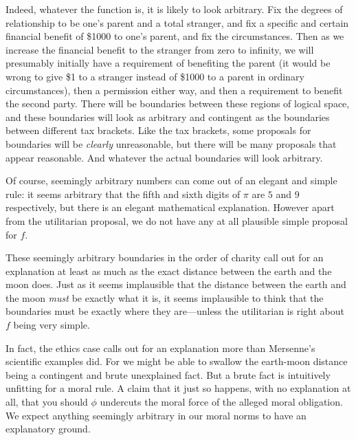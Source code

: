 Indeed, whatever the function is, it is likely to look arbitrary. Fix the degrees of relationship to be one's parent and a total stranger,
and fix a specific and certain financial benefit of \$1000 to one's parent, and fix the circumstances. Then as we increase the 
financial benefit to the stranger from zero to infinity, we will presumably initially have a requirement of benefiting the parent
(it would be wrong to give \$1 to a stranger instead of \$1000 to a parent in ordinary circumstances), 
then a permission either way, and then a requirement to benefit the second party. There will be boundaries between these regions
of logical space, and these boundaries will look as arbitrary and contingent as the boundaries between different tax brackets.
Like the tax brackets, some proposals for boundaries will be \textit{clearly} unreasonable, but there will be many proposals
that appear reasonable. And whatever the actual boundaries will look arbitrary.

Of course, seemingly arbitrary numbers can come out of an elegant and simple rule: it seems arbitrary that the fifth and sixth 
digits of $\pi$ are $5$ and $9$ respectively, but there is an elegant mathematical explanation. However apart from the
utilitarian proposal, we do not have any at all plausible simple proposal for $f$.

These seemingly arbitrary boundaries in the order of charity call out for an explanation at least as much as 
the exact distance between the earth and the moon does. Just as it seems implausible that the distance between the earth
and the moon \textit{must} be exactly what it is, it seems implausible to think that the boundaries must be exactly where
they are---unless the utilitarian is right about $f$ being very simple. 

In fact, the ethics case calls out for an explanation more than Mersenne's scientific examples did. For we might 
be able to swallow the earth-moon distance being a contingent and brute unexplained fact. But a brute fact is 
intuitively unfitting for a moral rule. A claim that it just so happens, with no explanation at all, that you should 
$\phi$ undercuts the moral force of the alleged moral obligation. We expect anything seemingly arbitrary in our moral norms to have an explanatory ground.

